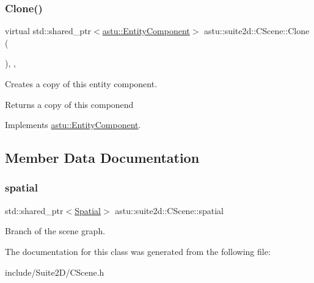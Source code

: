 \subsubsection{\texorpdfstring{Clone()}{Clone()}}
{\footnotesize\ttfamily virtual std\+::shared\+\_\+ptr$<$\hyperlink{classastu_1_1EntityComponent}{astu\+::\+Entity\+Component}$>$ astu\+::suite2d\+::\+C\+Scene\+::\+Clone (\begin{DoxyParamCaption}{ }\end{DoxyParamCaption})\hspace{0.3cm}{\ttfamily [inline]}, {\ttfamily [override]}, {\ttfamily [virtual]}}

Creates a copy of this entity component.

\begin{DoxyReturn}{Returns}
a copy of this componend 
\end{DoxyReturn}


Implements \hyperlink{classastu_1_1EntityComponent_afeddb5a899d831255a9a4f07269f3b2d}{astu\+::\+Entity\+Component}.



\subsection{Member Data Documentation}
\mbox{\label{classastu_1_1suite2d_1_1CScene_af8b497f2d0dac0c1bb4d7d3038280189}} 
\subsubsection{\texorpdfstring{spatial}{spatial}}
{\footnotesize\ttfamily std\+::shared\+\_\+ptr$<$\hyperlink{classastu_1_1suite2d_1_1Spatial}{Spatial}$>$ astu\+::suite2d\+::\+C\+Scene\+::spatial}

Branch of the scene graph. 

The documentation for this class was generated from the following file\+:\begin{DoxyCompactItemize}
\item 
include/\+Suite2\+D/C\+Scene.\+h\end{DoxyCompactItemize}
